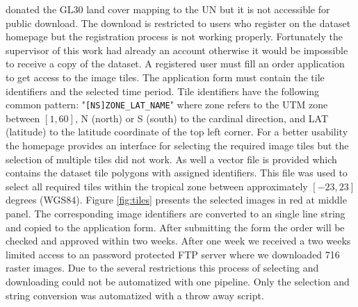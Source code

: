 		\citeauthor{Chen2015} donated the \ac{GL30} land cover mapping to the \ac{UN} but it is not accessible for public download. The download is restricted to users who register on the dataset homepage but the registration process is not working properly. Fortunately the supervisor of this work had already an account otherwise it would be impossible to receive a copy of the dataset. A registered user must fill an order application to get access to the image tiles. The application form must contain the tile identifiers and the selected time period. Tile identifiers have the following common pattern: "\verb|[NS]ZONE_LAT_NAME|" where zone refers to the \ac{UTM} zone between $[1, 60]$, N (north) or S (south) to the cardinal direction, and LAT (latitude) to the latitude coordinate of the top left corner. For a better usability the homepage provides an interface for selecting the required image tiles but the selection of multiple tiles did not work. As well a vector file is provided which contains the dataset tile polygons with assigned identifiers. This file was used to select all required tiles within the tropical zone between approximately $[-23, 23]$ degrees (\ac{WGS84}). Figure \ref{fig:tiles} presents the selected images in red at middle panel. The corresponding image identifiers are converted to an single line string and copied to the application form. After submitting the form the order will be checked and approved within two weeks. After one week we received a two weeks limited access to an password protected \ac{FTP} server where we downloaded 716 raster images. Due to the several restrictions this process of selecting and downloading could not be automatized with one pipeline. Only the selection and string conversion was automatized with a throw away script.
